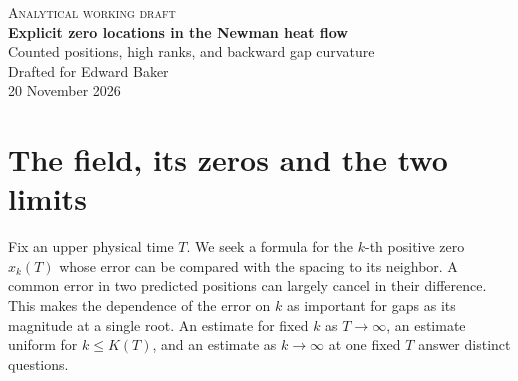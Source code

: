 \documentclass[11pt,letterpaper]{article}
\numberwithin{equation}{section}
\begin{document}
\thispagestyle{plain}
\begin{center}
{\small\scshape Analytical working draft}\\[8pt]
{\LARGE\bfseries Explicit zero locations in the Newman heat flow}\\[5pt]
{\large Counted positions, high ranks, and backward gap curvature}\\[9pt]
{\large Drafted for Edward Baker}\\[3pt]
20 November 2026
\end{center}
\begin{abstract}
We derive estimates for consecutive zeros of the Newman heat flow from the theta source at one time. As the time \(T\) grows, a single inverse phase counts a prefix of order \(\sqrt T(\log T)^2\). Differentiating its cubic remainder gains a factor of order the reciprocal rank in the spacing error as the rank grows. At a fixed positive time with an independently all-real divisor, the same even moments admit two reconstructions of a high zero. Direct polynomial evaluation with a circle count gives sufficient moment order and relative coefficient precision \(O_T(k+\log(1/\epsilon))\) for accuracy \(\epsilon\) in units of the \(k\)-th spacing. An imaginary-axis growth comparison identifies the absolute ranks in Polymath's eventual clock at \(T=1/2\).

For the time evolution we first express the gap velocity through a sum over all other zeros. We then tilt the complete source at the upper time. On an interior portion of the growing prefix the squared half-gap widens backward and has positive second derivative throughout a time interval of length \(\sqrt\kappa/(2L)\), where \(L\) is the upper saddle and \(\kappa\) its curvature. The leading curvature comes from the cubic asymmetry of the saddle. The remaining problems are to connect the height ranges at a specified time and to propagate counted gaps toward lower time.
\end{abstract}
\begingroup
\small
\tableofcontents
\endgroup
\clearpage
\section{The field, its zeros and the two limits}\label{sec:source}
Fix an upper physical time \(T\). We seek a formula for the \(k\)-th positive zero \(x_k(T)\) whose error can be compared with the spacing to its neighbor. A common error in two predicted positions can largely cancel in their difference. This makes the dependence of the error on \(k\) as important for gaps as its magnitude at a single root. An estimate for fixed \(k\) as \(T\to\infty\), an estimate uniform for \(k\le K(T)\), and an estimate as \(k\to\infty\) at one fixed \(T\) answer distinct questions.
\end{document}
